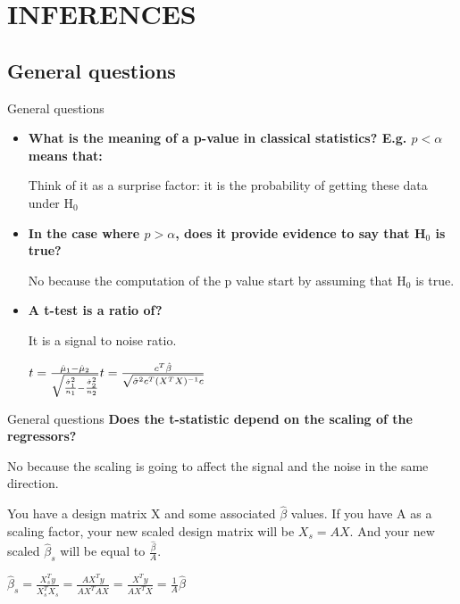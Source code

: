 \documentclass{beamer}
\begin{document}




\section{INFERENCES}

\subsection[General questions]{General questions}

\begin{frame}{General questions}
  \begin{itemize}
    \item \textbf{What is the meaning of a p-value in classical statistics? E.g. $p < \alpha$ means that:}

\smallskip 
Think of it as a surprise factor: it is the probability of getting these data under H$_{0}$

\bigskip
    \item \textbf{In the case where $p > \alpha$, does it provide evidence to say that H$_{0}$ is true?}

\smallskip     
No because the computation of the p value start by assuming that H$_{0}$ is true.

\bigskip
    \item \textbf{A t-test is a ratio of?}

\smallskip 
It is a signal to noise ratio.

    $
     t = \frac{\hat{\mu}_{1} - \hat{\mu}_{2}}{\sqrt{\frac{\hat{\sigma}_{1}^{2}}{n_{1}} - \frac{\hat{\sigma}_{2}^{2}}{n_{2}} } }
     \hfill
     t = \frac{ c^{T} \hat{\beta} } { \sqrt{ \hat{\sigma}^{2} c^{T} (X^{T} X)^{-1} c } }
    $
  \end{itemize}
\end{frame}      


\begin{frame}{General questions}
\textbf{Does the t-statistic depend on the scaling of the regressors?}

\smallskip
No because the scaling is going to affect the signal and the noise in the same direction.

You have a design matrix X and some associated $\hat{\beta}$ values. If you have A as a scaling factor, your new scaled design matrix will be $X_{s}=AX$. And your new scaled $\hat{\beta}_{s}$ will be equal to $\frac{\hat{\beta}}{A}$.

  \begin{center}
    $\hat{\beta}_{s} = \frac{X_{s}^{T}y}{X_{s}^{T}X_{s}}
    = \frac{AX^{T}y}{AX^{T}AX}
    = \frac{X^{T}y}{AX^{T}X}
    = \frac{1}{A}\hat{\beta}$ 
  \end{center}
\end{frame} 
\end{document}
